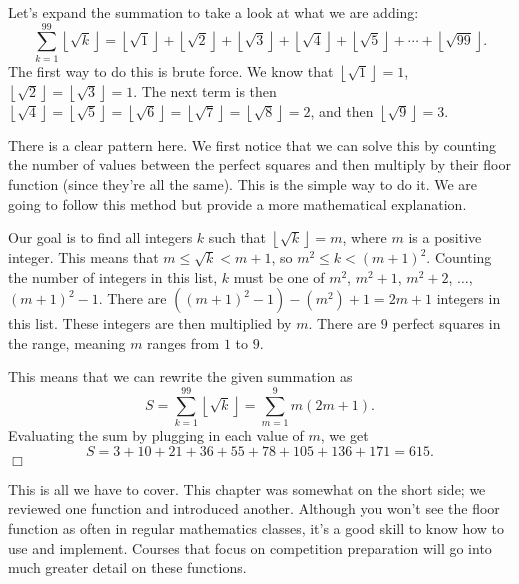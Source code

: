 \documentclass[lang=en,11pt]{elegantbook}
\begin{document}
\begin{solution}
Let's expand the summation to take a look at what we are adding: $$\sum_{k=1}^{99}{\left\lfloor{\sqrt{k}}\right\rfloor}=\left\lfloor{\sqrt{1}}\right\rfloor+\left\lfloor{\sqrt{2}}\right\rfloor+\left\lfloor{\sqrt{3}}\right\rfloor+\left\lfloor{\sqrt{4}}\right\rfloor+\left\lfloor{\sqrt{5}}\right\rfloor+\cdots+\left\lfloor{\sqrt{99}}\right\rfloor.$$
The first way to do this is brute force.  We know that $\left\lfloor{\sqrt{1}}\right\rfloor=1$, $\left\lfloor{\sqrt{2}}\right\rfloor=\left\lfloor{\sqrt{3}}\right\rfloor=1$.  The next term is then $\left\lfloor{\sqrt{4}}\right\rfloor=\left\lfloor{\sqrt{5}}\right\rfloor=\left\lfloor{\sqrt{6}}\right\rfloor=\left\lfloor{\sqrt{7}}\right\rfloor=\left\lfloor{\sqrt{8}}\right\rfloor=2$, and then $\left\lfloor{\sqrt{9}}\right\rfloor=3$.

There is a clear pattern here.  We first notice that we can solve this by counting the number of values between the perfect squares and then multiply by their floor function (since they're all the same).  This is the simple way to do it.  We are going to follow this method but provide a more mathematical explanation.

Our goal is to find all integers $k$ such that $\left\lfloor{\sqrt{k}}\right\rfloor=m$, where $m$ is a positive integer.  This means that $m\leq \sqrt{k}<m+1$, so $m^2\leq k<(m+1)^2$.  Counting the number of integers in this list, $k$ must be one of $m^2$, $m^2+1$, $m^2+2$, $\ldots$, $(m+1)^2-1$.  There are $((m+1)^2-1)-(m^2)+1=2m+1$ integers in this list.  These integers are then multiplied by $m$.  There are $9$ perfect squares in the range, meaning $m$ ranges from $1$ to $9$.

This means that we can rewrite the given summation as $$S=\sum_{k=1}^{99}{\left\lfloor{\sqrt{k}}\right\rfloor}=\sum_{m=1}^{9}{m(2m+1)}.$$  Evaluating the sum by plugging in each value of $m$, we get $$S=3+10+21+36+55+78+105+136+171=615.$$ $\Box$
\end{solution}
This is all we have to cover.  This chapter was somewhat on the short side; we reviewed one function and introduced another.  Although you won't see the floor function as often in regular mathematics classes, it's a good skill to know how to use and implement.  Courses that focus on competition preparation will go into much greater detail on these functions.
\end{document}
